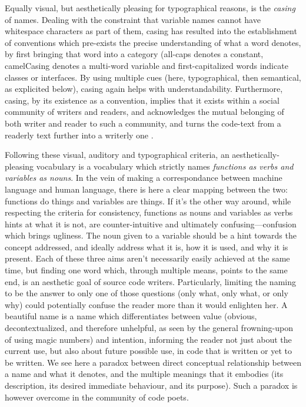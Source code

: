 Equally visual, but aesthetically pleasing for typographical reasons, is the \emph{casing} of names. Dealing with the constraint that variable names cannot have whitespace characters as part of them, casing has resulted into the establishment of conventions which pre-exists the precise understanding of what a word denotes, by first bringing that word into a category (all-caps denotes a constant, camelCasing denotes a multi-word variable and first-capitalized words indicate classes or interfaces. By using multiple cues (here, typographical, then semantical, as explicited below), casing again helps with understandability. Furthermore, casing, by its existence as a convention, implies that it exists within a social community of writers and readers, and acknowledges the mutual belonging of both writer and reader to such a community, and turns the code-text from a readerly text further into a writerly one \citep{barthes_bruissement_1984}.

Following these visual, auditory and typographical criteria, an aesthetically-pleasing vocabulary is a vocabulary which strictly names \emph{functions as verbs and variables as nouns}. In the vein of making a correspondance between machine language and human language, there is here a clear mapping between the two: functions do things and variables are things. If it's the other way around, while respecting the criteria for consistency, functions as nouns and variables as verbs hints at what it is not, are counter-intuitive and ultimately confusing—confusion which brings ugliness. The noun given to a variable should be a hint towards the concept addressed, and ideally address what it is, how it is used, and why it is present. Each of these three aims aren't necessarily easily achieved at the same time, but finding one word which, through multiple means, points to the same end, is an aesthetic goal of source code writers. Particularly, limiting the naming to be the answer to only one of those questions (only what, only what, or only why) could potentially confuse the reader more than it would enlighten her. A beautiful name is a name which differentiates between value (obvious, decontextualized, and therefore unhelpful, as seen by the general frowning-upon of using magic numbers) and intention, informing the reader not just about the current use, but also about future possible use, in code that is written or yet to be written. We see here a paradox between direct conceptual relationship between a name and what it denotes, and the multiple meanings that it embodies (its description, its desired immediate behaviour, and its purpose). Such a paradox is however overcome in the community of code poets.

